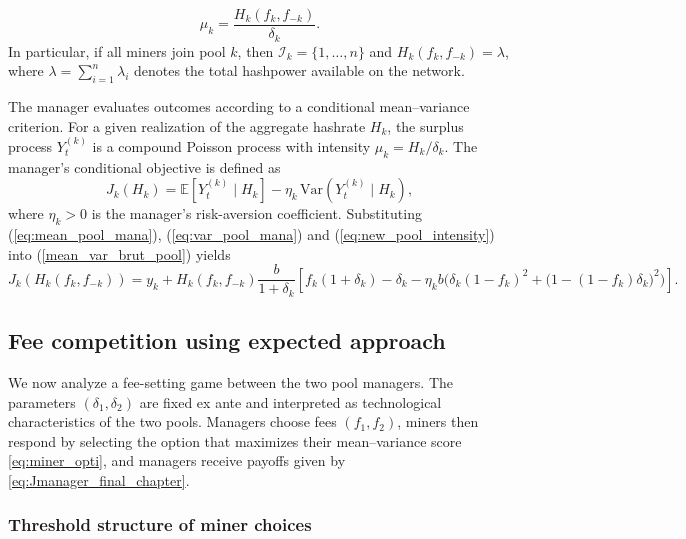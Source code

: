 \begin{equation}\label{eq:new_pool_intensity}
    \mu_k = \frac{H_k(f_k, f_{-k})}{\delta_k}.
\end{equation}
In particular, if all miners join pool $k$, then $\mathcal{I}_k = \{1, \dots, n\}$ 
and $H_k(f_k, f_{-k}) = \lambda$, where $\lambda = \sum_{i=1}^{n} \lambda_i$ 
denotes the total hashpower available on the network. 

The manager evaluates outcomes according to a conditional mean--variance criterion. 
For a given realization of the aggregate hashrate $H_k$, the surplus process 
$Y_t^{(k)}$ is a compound Poisson process with intensity 
$\mu_k = H_k / \delta_k$. The manager's conditional objective is defined as
\begin{equation}\label{mean_var_brut_pool}
J_k(H_k)
=
\mathbb{E}\!\left[Y_t^{(k)} \mid H_k\right]
-
\eta_k\,\mathrm{Var}\!\left(Y_t^{(k)} \mid H_k\right),
\end{equation}
where $\eta_k>0$ is the manager's risk-aversion coefficient. Substituting (\ref{eq:mean_pool_mana}), (\ref{eq:var_pool_mana}) and (\ref{eq:new_pool_intensity}) into (\ref{mean_var_brut_pool}) yields
\begin{equation}
\label{eq:Jmanager_final_chapter}
J_k(H_k(f_k, f_{-k}))
=
y_k
+
H_k(f_k, f_{-k})\frac{b}{1+\delta_k}
\left[
f_k(1+\delta_k)-\delta_k
-\eta_k b\Big(
\delta_k(1-f_k)^2+\big(1-(1-f_k)\delta_k\big)^2
\Big)
\right].
\end{equation}

\subsection{Fee competition using expected approach}

We now analyze a fee-setting game between the two pool managers. The parameters $(\delta_1,\delta_2)$ are fixed ex ante and interpreted as technological characteristics of the two pools. Managers choose fees $(f_1,f_2)$, miners then respond by selecting the option that maximizes their mean--variance score \eqref{eq:miner_opti}, and managers receive payoffs given by \eqref{eq:Jmanager_final_chapter}. 

\subsubsection{Threshold structure of miner choices}

